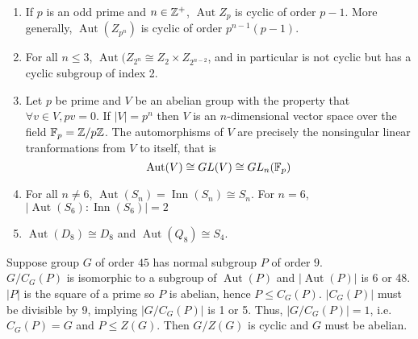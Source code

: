 \documentclass{report}
\newcommand{\mprop}[2]{\begin{Prop}{#1}{}#2\end{Prop}}
\newcommand{\ex}[2]{\begin{Example}{#1}{}#2\end{Example}}
\DeclareMathOperator{\Aut}{Aut}
\DeclareMathOperator{\Inn}{Inn}
\begin{document}
\mprop{}{\begin{enumerate}
    \item If $p$ is an odd prime and $n \in \mathbb{Z}^+$, $\Aut Z_p$ is cyclic of order $p-1$. More generally, $\Aut(Z_{p^n})$ is cyclic of order $p^{n-1}(p-1)$. 
    \item For all $n \leq 3$, $\Aut(Z_{2^n} \cong Z_2 \times Z_{2^{n-2}}$, and in particular is not cyclic but has a cyclic subgroup of index 2. 
    \item Let $p$ be prime and $V$ be an abelian group with the property that $\forall v \in V, pv = 0$. If $|V| = p^n$ then $V$ is an $n$-dimensional vector space over the field $\mathbb{F}_p = \mathbb{Z}/p\mathbb{Z}$. The automorphisms of $V$ are precisely the nonsingular linear tranformations from $V$ to itself, that is
    $$\Aut(V) \cong GL(V) \cong GL_n (\bbF_p)$$
    \item For all $n \neq 6$, $\Aut(S_n) = \Inn (S_n) \cong S_n$. For $n = 6$, $|\Aut(S_6) : \Inn(S_6)| = 2$
    \item $\Aut(D_8) \cong D_8$ and $\Aut(Q_8) \cong S_4$.
\end{enumerate}}
\ex{}{Suppose group $G$ of order $45$ has normal subgroup $P$ of order $9$. \\
$G/C_G(P)$ is isomorphic to a subgroup of $\Aut(P)$ and $|\Aut(P)|$ is 6 or 48. $|P|$ is the square of a prime so $P$ is abelian, hence $P \leq C_G(P)$. $|C_G(P)|$ must be divisible by 9, implying $|G/C_G(P)|$ is 1 or 5. Thus, $|G/C_G(P)| = 1$, i.e. $C_G(P) = G$ and $P \leq Z(G)$. Then $G/Z(G)$ is cyclic and $G$ must be abelian.}
\end{document}

